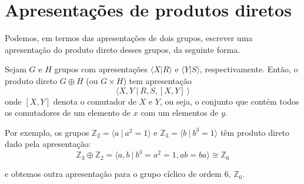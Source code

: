 	\section{Apresentações de produtos diretos}
	    Podemos, em termos das apresentações de dois grupos, escrever uma apresentação do produto direto 
	    desses grupos, da seguinte forma.
    	\begin{prop}
    	\label{apresentacao prod direto}
        	Sejam $G$ e $H$ grupos com apresentações $\langle X|R \rangle$ e $\langle Y|S \rangle$,
        	respectivamente. Então, o produto direto $G\oplus H$ (ou $G\times H$) tem apresentação
        	\begin{equation*}
        	    \langle X,Y \ | \ R,S, [X,Y] \ \rangle
        	\end{equation*}
        	onde $[X,Y]$ denota o comutador de $X$ e $Y$, ou seja, o conjunto que contém todos os 
        	comutadores de um elemento de $x$ com um elementos de $y$.
    	\end{prop}
    	\par\vspace{0.3cm} Por exemplo, os grupos $\mathbb{Z}_2 = \langle a\ | \ a^2=1 \rangle$ e 
    	$\mathbb{Z}_3 = \langle b\ | \ b^3=1 \rangle$ têm produto direto dado pela apresentação:
    	\begin{equation*}
    	    \mathbb{Z}_3\oplus\mathbb{Z}_2 = \langle a,b \ | \ b^3=a^2=1, ab = ba \rangle \cong \mathbb{Z}_6 
    	\end{equation*}
    	\par\vspace{0.3cm} e obtemos outra apresentação para o grupo cíclico de ordem $6$, $\mathbb{Z}_6$.
